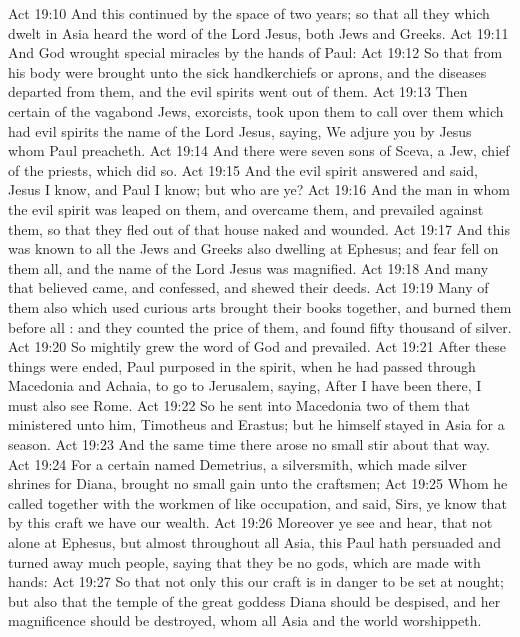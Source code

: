 \vs Act 19:10 And this continued by the space of two years; so that all they which dwelt in Asia heard the word of the Lord Jesus, both Jews and Greeks.
\vs Act 19:11 And God wrought special miracles by the hands of Paul:
\vs Act 19:12 So that from his body were brought unto the sick handkerchiefs or aprons, and the diseases departed from them, and the evil spirits went out of them.
\vs Act 19:13 Then certain of the vagabond Jews, exorcists, took upon them to call over them which had evil spirits the name of the Lord Jesus, saying, We adjure you by Jesus whom Paul preacheth.
\vs Act 19:14 And there were seven sons of  Sceva, a Jew,  chief of the priests, which did so.
\vs Act 19:15 And the evil spirit answered and said, Jesus I know, and Paul I know; but who are ye?
\vs Act 19:16 And the man in whom the evil spirit was leaped on them, and overcame them, and prevailed against them, so that they fled out of that house naked and wounded.
\vs Act 19:17 And this was known to all the Jews and Greeks also dwelling at Ephesus; and fear fell on them all, and the name of the Lord Jesus was magnified.
\vs Act 19:18 And many that believed came, and confessed, and shewed their deeds.
\vs Act 19:19 Many of them also which used curious arts brought their books together, and burned them before all : and they counted the price of them, and found  fifty thousand  of silver.
\vs Act 19:20 So mightily grew the word of God and prevailed.
\vs Act 19:21 After these things were ended, Paul purposed in the spirit, when he had passed through Macedonia and Achaia, to go to Jerusalem, saying, After I have been there, I must also see Rome.
\vs Act 19:22 So he sent into Macedonia two of them that ministered unto him, Timotheus and Erastus; but he himself stayed in Asia for a season.
\vs Act 19:23 And the same time there arose no small stir about that way.
\vs Act 19:24 For a certain  named Demetrius, a silversmith, which made silver shrines for Diana, brought no small gain unto the craftsmen;
\vs Act 19:25 Whom he called together with the workmen of like occupation, and said, Sirs, ye know that by this craft we have our wealth.
\vs Act 19:26 Moreover ye see and hear, that not alone at Ephesus, but almost throughout all Asia, this Paul hath persuaded and turned away much people, saying that they be no gods, which are made with hands:
\vs Act 19:27 So that not only this our craft is in danger to be set at nought; but also that the temple of the great goddess Diana should be despised, and her magnificence should be destroyed, whom all Asia and the world worshippeth.
